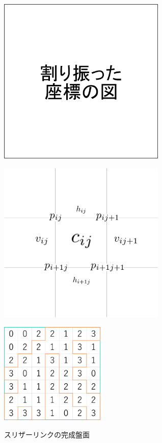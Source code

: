\begin{clearpagefigure}
  \includegraphics[width=8cm,clip]{fig/coordinate.png}
  \caption{}
  \label{figure:Coordinate}
\end{clearpagefigure}

\begin{clearpagefigure}
  \includegraphics[width=8cm,clip]{fig/define.png}
  \caption{}
  \label{figure:VariableAtBoard}
\end{clearpagefigure}

\begin{clearpagefigure}
  \includegraphics[width=5cm]{fig/slitherlink.png}
  \caption{スリザーリンクの完成盤面}
\end{clearpagefigure}

